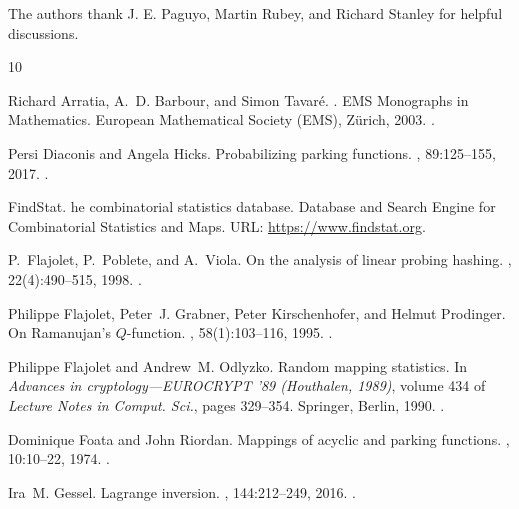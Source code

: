 \documentclass[letterpaper]{amsart}
\theoremstyle{plain}
\theoremstyle{definition}
\theoremstyle{remark}
\begin{document}
The authors thank J. E. Paguyo, Martin Rubey, and Richard Stanley for helpful discussions.


\begin{thebibliography}{10}

Richard Arratia, A.~D. Barbour, and Simon Tavar\'e.
.
\newblock EMS Monographs in Mathematics. European Mathematical Society (EMS), Z\"urich, 2003.
\newblock \href {https://doi.org/10.4171/000} {}.

Persi Diaconis and Angela Hicks.
\newblock Probabilizing parking functions.
, 89:125--155, 2017.
\newblock \href {https://doi.org/10.1016/j.aam.2017.05.004} {}.

FindStat.
he combinatorial statistics database.
\newblock Database and Search Engine for Combinatorial Statistics and Maps.
\newblock URL: \url{https://www.findstat.org}.

P.~Flajolet, P.~Poblete, and A.~Viola.
\newblock On the analysis of linear probing hashing.
, 22(4):490--515, 1998.
\newblock \href {https://doi.org/10.1007/PL00009236} {}.

Philippe Flajolet, Peter~J. Grabner, Peter Kirschenhofer, and Helmut Prodinger.
\newblock On {R}amanujan's {$Q$}-function.
, 58(1):103--116, 1995.
\newblock \href {https://doi.org/10.1016/0377-0427(93)E0258-N} {}.

Philippe Flajolet and Andrew~M. Odlyzko.
\newblock Random mapping statistics.
\newblock In {\em Advances in cryptology---{EUROCRYPT} '89 ({H}outhalen, 1989)}, volume 434 of {\em Lecture Notes in Comput. Sci.}, pages 329--354. Springer, Berlin, 1990.
\newblock \href {https://doi.org/10.1007/3-540-46885-4\_34} {}.

Dominique Foata and John Riordan.
\newblock Mappings of acyclic and parking functions.
, 10:10--22, 1974.
\newblock \href {https://doi.org/10.1007/BF01834776} {}.

Ira~M. Gessel.
\newblock Lagrange inversion.
, 144:212--249, 2016.
\newblock \href {https://doi.org/10.1016/j.jcta.2016.06.018} {}.


\end{thebibliography}
\end{document}
